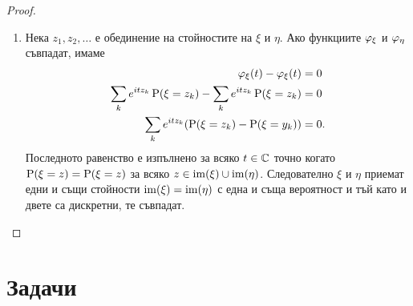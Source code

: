 \documentclass[numbers=endperiod, DIV=15, bibliography=totocnumbered]{scrartcl}
\begin{document}
\begin{proof}
\begin{enumerate}
    \item Нека $z_1, z_2, \ldots$ е обединение на стойностите на $\xi$ и $\eta$. Ако функциите $\varphi_\xi$ и $\varphi_\eta$ съвпадат, имаме
    \begin{align*}
      \varphi_\xi(t) - \varphi_\xi(t) &= 0
      \\
      \sum_k e^{i t z_k} \operatorname{P}(\xi = z_k) - \sum_k e^{i t z_k} \operatorname{P}(\xi = z_k) &= 0
      \\
      \sum_k e^{i t z_k} (\operatorname{P}(\xi = z_k) - \operatorname{P}(\xi = y_k)) &= 0.
    \end{align*}
    Последното равенство е изпълнено за всяко $t \in \mathbb{C}$ точно когато $\operatorname{P}(\xi = z) = \operatorname{P}(\xi = z)$ за всяко $z \in \operatorname{im}(\xi) \cup \operatorname{im}(\eta)$. Следователно $\xi$ и $\eta$ приемат едни и същи стойности $\operatorname{im}(\xi) = \operatorname{im}(\eta)$ с една и съща вероятност и тъй като и двете са дискретни, те съвпадат.
  \end{enumerate}
\end{proof}

\section{Задачи}

\printbibliography
\end{document}
